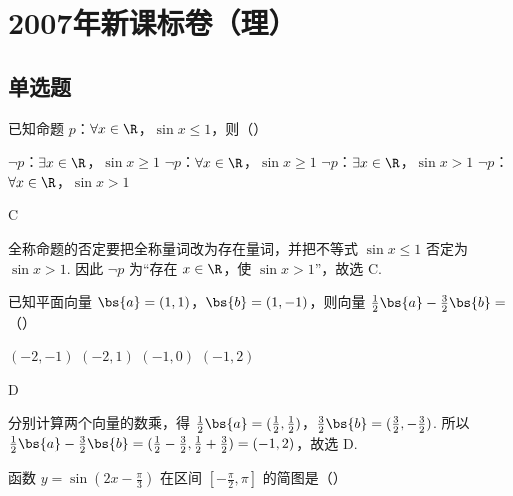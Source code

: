 \chapter{2007年新课标卷（理）}

\section{单选题}

\begin{problem}
已知命题 \(p\)：\(\forall x \in \R\)，\(\sin x \leqslant 1\)，则（\quad）

\choices
    {\(\neg p\)：\(\exists x \in \R\)，\(\sin x \geqslant 1\)}
    {\(\neg p\)：\(\forall x \in \R\)，\(\sin x \geqslant 1\)}
    {\(\neg p\)：\(\exists x \in \R\)，\(\sin x > 1\)}
    {\(\neg p\)：\(\forall x \in \R\)，\(\sin x > 1\)}
\end{problem}

\begin{answer}
C
\end{answer}

\begin{solution}
全称命题的否定要把全称量词改为存在量词，并把不等式 \(\sin x\leqslant 1\) 否定为 \(\sin x>1\). 因此 \(\neg p\) 为“存在 \(x\in\R\)，使 \(\sin x>1\)”，故选 C.
\end{solution}

\begin{problem}
已知平面向量 \(\bs{a} = (1,1)\)，\(\bs{b} = (1,-1)\)，则向量 \(\frac{1}{2}\bs{a} - \frac{3}{2}\bs{b} =\)（\quad）

\choices
    {\((-2, - 1)\)}
    {\((-2, 1)\)}
    {\((-1, 0)\)}
    {\((-1, 2)\)}
\end{problem}

\begin{answer}
D
\end{answer}

\begin{solution}
分别计算两个向量的数乘，得 \(\frac{1}{2}\bs{a}=(\frac{1}{2},\frac{1}{2})\)，\(\frac{3}{2}\bs{b}=(\frac{3}{2},-\frac{3}{2})\). 所以
\(\frac{1}{2}\bs{a}-\frac{3}{2}\bs{b}=(\frac{1}{2}-\frac{3}{2},\frac{1}{2}+\frac{3}{2})=(-1,2)\)，故选 D.
\end{solution}

\begin{problem}
函数 \( y = \sin \left(2x - \frac{\pi}{3}\right) \) 在区间 \(\left[-\frac{\pi}{2}, \pi\right]\) 的简图是（\quad）

    {}
    {}
    {}
\end{problem}

